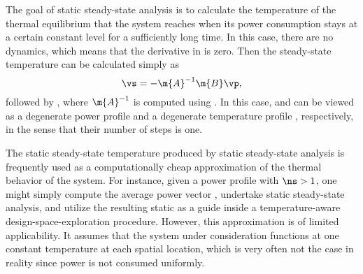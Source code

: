 The goal of static steady-state analysis is to calculate the temperature of the
thermal equilibrium that the system reaches when its power consumption stays at
a certain constant level \vp for a sufficiently long time. In this case, there
are no dynamics, which means that the derivative in
 is zero. Then the steady-state temperature \vq
can be calculated simply as
\[
  \vs = -\m{A}^{-1} \m{B} \vp,
\]
followed by , where $\m{A}^{-1}$ is computed using
. In this case, \vp and \vq can be viewed as a degenerate
power profile \mp and a degenerate temperature profile \mq, respectively, in the
sense that their number of steps \ns is one.

The static steady-state temperature produced by static steady-state analysis is
frequently used as a computationally cheap approximation of the thermal behavior
of the system. For instance, given a power profile \mp with $\ns > 1$, one might
simply compute the average power vector \vp, undertake static steady-state
analysis, and utilize the resulting static \vq as a guide inside a
temperature-aware design-space-exploration procedure. However, this
approximation is of limited applicability. It assumes that the system under
consideration functions at one constant temperature at each spatial location,
which is very often not the case in reality since power is not consumed
uniformly.
